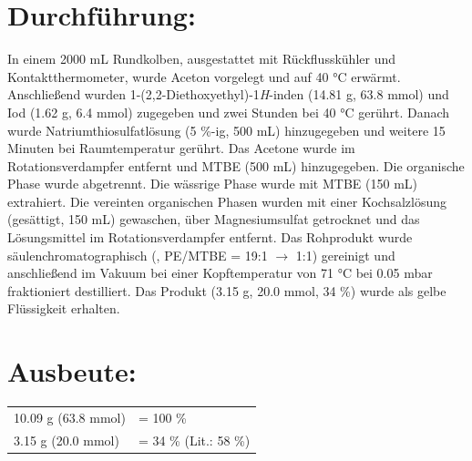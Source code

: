 \documentclass[12pt]{article}
\begin{document}
\begin{onehalfspace}
\section{Durchführung:\cite{vor}}
In einem 2000 \si{\milli\liter} Rundkolben, ausgestattet mit Rückflusskühler und Kontaktthermometer, wurde Aceton vorgelegt und auf 40 \si{\celsius} erwärmt. Anschließend wurden 1-(2,2-Diethoxyethyl)-1\textit{H}-inden (14.81 \si{\gram}, 63.8 \si{\milli\mol}) und Iod (1.62 \si{\gram}, 6.4 \si{\milli\mol}) zugegeben und zwei Stunden bei 40 \si{\celsius} gerührt. Danach wurde Natriumthiosulfatlösung (5 \%-ig, 500 \si{\milli\liter}) hinzugegeben und weitere 15 Minuten bei Raumtemperatur gerührt. Das Acetone wurde im Rotationsverdampfer entfernt und MTBE (500 \si{\milli\liter}) hinzugegeben. Die organische Phase wurde abgetrennt. Die wässrige Phase wurde mit MTBE (150 \si{\milli\liter}) extrahiert. Die vereinten organischen Phasen wurden mit einer Kochsalzlösung (gesättigt, 150 \si{\milli\liter}) gewaschen, über Magnesiumsulfat getrocknet und das Lösungsmittel im Rotationsverdampfer entfernt. Das Rohprodukt wurde säulenchromatographisch (, PE/MTBE = 19:1 $\rightarrow$ 1:1) gereinigt und anschließend im Vakuum bei einer Kopftemperatur von 71 \si{\celsius} bei 0.05 \si{\milli\bar} fraktioniert destilliert. Das Produkt (3.15 \si{\gram}, 20.0 \si{\milli\mol}, 34 \%) wurde als gelbe Flüssigkeit erhalten.
\section{Ausbeute:}
\begin{tabular}{ ll}
  10.09 \si{\gram} (63.8 \si{\milli\mol})   & = 100 \%\\
  3.15 \si{\gram} (20.0 \si{\milli\mol})   & = 34 \% (Lit.:\cite{vor} 58 \%) \\
 \end{tabular}
\newpage 

\end{onehalfspace}
\end{document}
